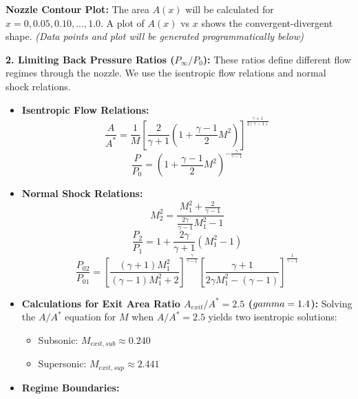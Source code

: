 \textbf{Nozzle Contour Plot:} The area \(A(x)\) will be calculated for
\(x = 0, 0.05, 0.10, ..., 1.0\). A plot of \(A(x)\) vs \(x\) shows the
convergent-divergent shape. \emph{(Data points and plot will be
generated programmatically below)}

\textbf{2. Limiting Back Pressure Ratios (\(P_{\infty} / P_0\)):} These
ratios define different flow regimes through the nozzle. We use the
isentropic flow relations and normal shock relations.

\begin{itemize}
\item
  \textbf{Isentropic Flow Relations:}
  \[ \frac{A}{A^*} = \frac{1}{M} \left[ \frac{2}{\gamma+1} \left( 1 + \frac{\gamma-1}{2} M^2 \right) \right]^{\frac{\gamma+1}{2(\gamma-1)}} \]
  \[ \frac{P}{P_0} = \left( 1 + \frac{\gamma-1}{2} M^2 \right)^{-\frac{\gamma}{\gamma-1}} \]
\item
  \textbf{Normal Shock Relations:}
  \[ M_2^2 = \frac{M_1^2 + \frac{2}{\gamma - 1}}{\frac{2\gamma}{\gamma - 1}M_1^2 - 1} \]
  \[ \frac{P_2}{P_1} = 1 + \frac{2\gamma}{\gamma + 1}(M_1^2 - 1) \]
  \[ \frac{P_{02}}{P_{01}} = \left[ \frac{(\gamma + 1)M_1^2}{(\gamma - 1)M_1^2 + 2} \right]^{\frac{\gamma}{\gamma - 1}} \left[ \frac{\gamma + 1}{2\gamma M_1^2 - (\gamma - 1)} \right]^{\frac{1}{\gamma - 1}} \]
\item
  \textbf{Calculations for Exit Area Ratio \(A_{exit}/A^* = 2.5\)
  (\(\\gamma=1.4\)):} Solving the \(A/A^*\) equation for \(M\) when
  \(A/A^*=2.5\) yields two isentropic solutions:

  \begin{itemize}
  \tightlist
  \item
    Subsonic: \(M_{exit, sub} \approx 0.240\)
  \item
    Supersonic: \(M_{exit, sup} \approx 2.441\)
  \end{itemize}
\item
  \textbf{Regime Boundaries:}


\end{itemize}
